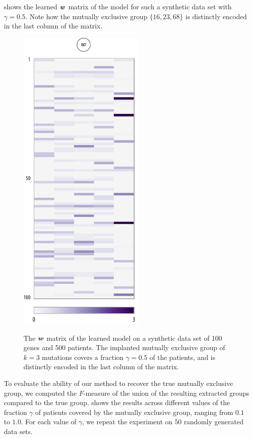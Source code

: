  shows the learned $\bm{w}$ matrix of the \fldc{} model for such a synthetic data set with $\gamma = 0.5$.
Note how the mutually exclusive group $\{16, 23, 68\}$ is distinctly encoded in the last column of the matrix.

\begin{figure}[htbp]
\centering
\includegraphics[width=0.55\textwidth]{figures/genes/mat_syn.pdf}\\[1em]
\caption{The $\bm{w}$ matrix of the learned \fldc{} model on a synthetic data set of 100 genes and 500 patients.
The implanted mutually exclusive group of $k = 3$ mutations covers a fraction $\gamma = 0.5$ of the patients, and is distinctly encoded in the last column of the matrix.}
\label{fig:syn_mat}
\end{figure}

To evaluate the ability of our method to recover the true mutually exclusive group, we computed the $F$-measure of the union of the resulting extracted groups compared to the true group.
 shows the results across different values of the fraction $\gamma$ of patients covered by the mutually exclusive group, ranging from $0.1$ to $1.0$.
For each value of $\gamma$, we repeat the experiment on $50$ randomly generated data sets.

